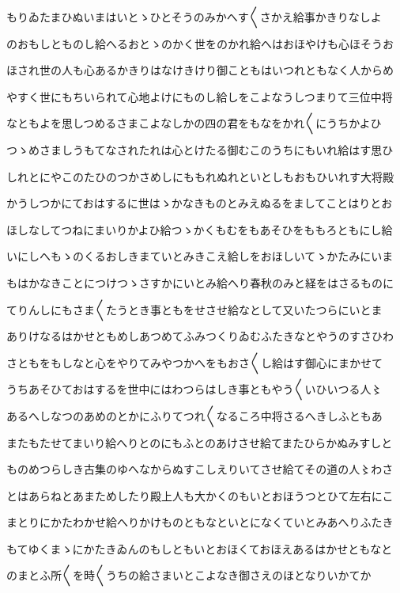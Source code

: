 \documentclass[a4paper,11pt,landscape]{ltjtarticle}
\begin{document}
もりゐたまひぬいまはいとゝひとそうのみかへす〱さかえ給事かきりなしよ
\par\medskip
のおもしとものし給へるおとゝのかく世をのかれ給へはおほやけも心ほそうお
\par\medskip
ほされ世の人も心あるかきりはなけきけり御こともはいつれともなく人からめ
\par\medskip
やすく世にもちいられて心地よけにものし給しをこよなうしつまりて三位中将
\par\medskip
なともよを思しつめるさまこよなしかの四の君をもなをかれ〱にうちかよひ
\par\medskip
つゝめさましうもてなされたれは心とけたる御むこのうちにもいれ給はす思ひ
\par\medskip
しれとにやこのたひのつかさめしにももれぬれといとしもおもひいれす大将殿
\par\medskip
かうしつかにておはするに世はゝかなきものとみえぬるをましてことはりとお
\par\medskip
ほしなしてつねにまいりかよひ給つゝかくもむをもあそひをももろともにし給
\par\medskip
いにしへもゝのくるおしきまていとみきこえ給しをおほしいてゝかたみにいま
\par\medskip
もはかなきことにつけつゝさすかにいとみ給へり春秋のみと経をはさるものに
\par\medskip
てりんしにもさま〱たうとき事ともをせさせ給なとして又いたつらにいとま
\par\medskip
ありけなるはかせともめしあつめてふみつくりゐむふたきなとやうのすさひわ
\par\medskip
さともをもしなと心をやりてみやつかへをもおさ〱し給はす御心にまかせて
\par\medskip
うちあそひておはするを世中にはわつらはしき事ともやう〱いひいつる人〻
\par\medskip
あるへしなつのあめのとかにふりてつれ〱なるころ中将さるへきしふともあ
\par\medskip
またもたせてまいり給へりとのにもふとのあけさせ給てまたひらかぬみすしと
\par\medskip
ものめつらしき古集のゆへなからぬすこしえりいてさせ給てその道の人〻わさ
\par\medskip
とはあらねとあまためしたり殿上人も大かくのもいとおほうつとひて左右にこ
\par\medskip
まとりにかたわかせ給へりかけものともなといとになくていとみあへりふたき
\par\medskip
もてゆくまゝにかたきゐんのもしともいとおほくておほえあるはかせともなと
\par\medskip
のまとふ所〱を時〱うちの給さまいとこよなき御さえのほとなりいかてか
\end{document}
